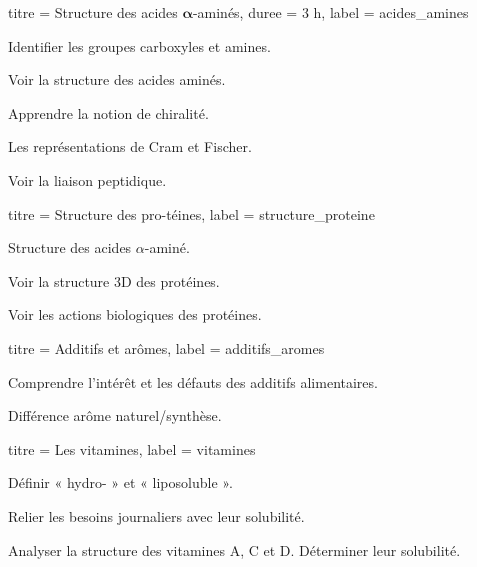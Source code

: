 \begin{multicols}{2}
  \begin{activite}{titre = Structure des acides $\mathbf{\alpha}$-aminés, duree = 3 h, label = acides_amines}
    \begin{prerequis}
      \item Identifier les groupes carboxyles et amines.
    \end{prerequis}
    \begin{objectifs}  
      \item Voir la structure des acides aminés.
      \item Apprendre la notion de chiralité.
      \item Les représentations de Cram et Fischer.
      \item Voir la liaison peptidique.
    \end{objectifs}
  \end{activite}
  \hfill {}

  \begin{activite}{titre = Structure des pro-téines, label = structure_proteine}
    \begin{prerequis}
      \item Structure des acides $\alpha$-aminé.
    \end{prerequis}
    \begin{objectifs}
      \item Voir la structure 3D des protéines.
      \item Voir les actions biologiques des protéines.
    \end{objectifs}
  \end{activite}
  \smallskip

  \setcounter{activiteNum}{5}
  \begin{activite}{titre = Additifs et arômes, label = additifs_aromes}
    \begin{objectifs}
      \item Comprendre l'intérêt et les défauts des additifs alimentaires.
      \item Différence arôme naturel/synthèse.
    \end{objectifs}
  \end{activite}

  \setcounter{activiteNum}{3}
  \begin{activite}{titre = Les vitamines, label = vitamines}
    \begin{objectifs}
      \item Définir « hydro- » et « liposoluble ».
      \item Relier les besoins journaliers avec leur solubilité.
      \item Analyser la structure des vitamines A, C et D. Déterminer leur solubilité.
    \end{objectifs}
  \end{activite}
  \hfill
  

\end{multicols}
